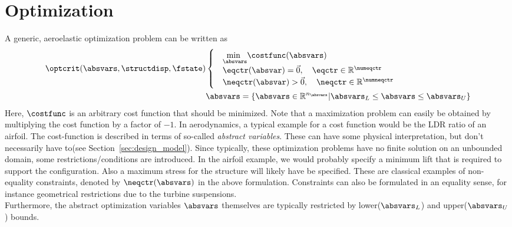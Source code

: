 \documentclass[../main.tex]{subfiles}
\begin{document}
\setlength{\delimitershortfall}{0pt}
\section{Optimization}\label{sec:optimization}




A generic, aeroelastic optimization problem can be written as
\begin{align}
\optcrit(\absvars,\structdisp,\fstate)
&\begin{cases}
&\underset{\absvars}{\text{min }}\costfunc(\absvars) \\%
&\eqctr(\absvar)=\vec{0},~~~\eqctr \in \mathbb{R}^{\numeqctr} \\
&\neqctr(\absvar)>\vec{0},~~~\neqctr \in \mathbb{R}^{\numneqctr} \\
\end{cases} \label{eq:generic_optimization_problem_1}\\
&\absvars = \{ \absvars \in \mathbb{R}^{n_{\absvars}} | \absvars_L \leq \absvars \leq \absvars_U \}\label{eq:generic_optimization_problem_2}
\end{align}
Here,  $\costfunc$ is an arbitrary cost function that should be minimized. Note that a maximization problem can easily be obtained by multiplying the cost function by a factor of $-1$. In aerodynamics, a typical example for a cost function would be the \ac{LDR} ratio of an airfoil. The cost-function is described in terms of so-called \textit{abstract variables}. These can have some physical interpretation, but don't necessarily have to(see Section~\ref{sec:design_model}). Since typically, these optimization problems have no finite solution on an unbounded domain, some restrictions/conditions are introduced. In the airfoil example, we would probably specify a minimum lift that is required to support the configuration. Also a maximum stress for the structure will likely have be specified. These are classical examples of non-equality constraints, denoted by $\neqctr(\absvars)$ in the above formulation. Constraints can also be formulated in an equality sense, for instance geometrical restrictions due to the turbine suspensions.\\
Furthermore, the abstract optimization variables $\absvars$ themselves are typically restricted by lower($\absvars_L$) and upper($\absvars_U$) bounds.\\
\end{document}
